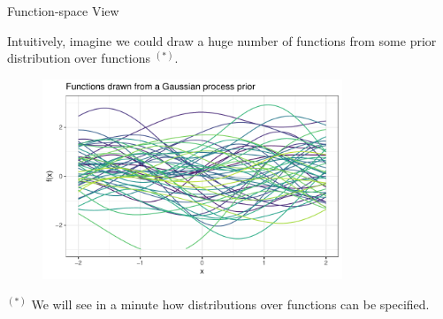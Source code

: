 \documentclass[11pt,compress,t,notes=noshow, xcolor=table]{beamer}
\begin{document}
\begin{vbframe}{Function-space View}

Intuitively, imagine we could draw a huge number of functions from some prior distribution over functions $^{(*)}$. 

\begin{figure}
  \includegraphics[width=0.8\textwidth]{figure/gp_sample/1_1.pdf}
\end{figure}

\vspace*{-0.5cm}

\begin{footnotesize}
  $^{(*)}$ We will see in a minute how distributions over functions can be specified. 
\end{footnotesize}

\end{vbframe}

\end{document}
